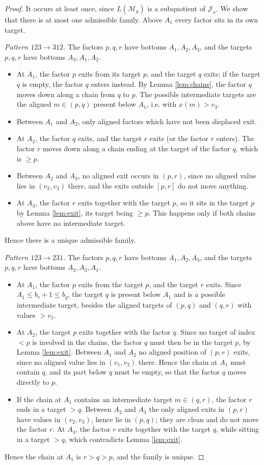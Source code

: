 \documentclass[a4paper,12pt,leqno]{amsart}
\newcommand{\caJ}{\mathcal{J}}
\newcommand{\caM}{\mathcal{M}}
\theoremstyle{plain}
\theoremstyle{definition}
\theoremstyle{definition}
\begin{document}
\begin{proof}
It occurs at least once, since $L(\caM_y)$ is a subquotient of $\caJ_x$. We show that there is at
most one admissible family. Above $A_1$ every factor sits in its own target.

\emph{Pattern $123\rightarrow312$.} The factors $p,q,r$ have bottoms $A_1,A_2,A_3$, and the targets
$p,q,r$ have bottoms $A_3,A_1,A_2$.
\begin{itemize}
\item At $A_1$, the factor $p$ exits from its target $p$, and the target $q$ exits; if the target $q$
is empty, the factor $q$ enters instead. By Lemma \ref{lem:chains}, the factor $q$ moves down along
a chain from $q$ to $p$. The possible intermediate targets are the aligned $m\in(p,q)$ present below
$A_1$, i.e. with $x(m)>v_3$.
\item Between $A_1$ and $A_2$, only aligned factors which have not been displaced exit.
\item At $A_2$, the factor $q$ exits, and the target $r$ exits (or the factor $r$ enters). The
factor $r$ moves down along a chain ending at the target of the factor $q$, which is $\geq p$.
\item Between $A_2$ and $A_3$, no aligned exit occurs in $(p,r)$, since no aligned value lies in
$(v_2,v_3)$ there, and the exits outside $[p,r]$ do not move anything.
\item At $A_3$, the factor $r$ exits together with the target $p$, so it sits in the target $p$
by Lemma \ref{lem:exit}, its target being $\geq p$. This happens only if both chains above have no
intermediate target.
\end{itemize}
Hence there is a unique admissible family.

\emph{Pattern $123\rightarrow231$.} The factors $p,q,r$ have bottoms $A_1,A_2,A_3$, and the targets
$p,q,r$ have bottoms $A_2,A_3,A_1$.
\begin{itemize}
\item At $A_1$, the factor $p$ exits from the target $p$, and the target $r$ exits. Since $A_1\leq
b_r+1\leq b_q$, the target $q$ is present below $A_1$ and is a possible intermediate target, besides
the aligned targets of $(p,q)$ and $(q,r)$ with values $>v_1$.
\item At $A_2$, the target $p$ exits together with the factor $q$. Since no target of index $<p$ is
involved in the chains, the factor $q$ must then be in the target $p$, by Lemma \ref{lem:exit}. Between $A_1$ and $A_2$ no
aligned position of $(p,r)$ exits, since no aligned value lies in $(v_1,v_2)$ there. Hence the
chain at $A_1$ must contain $q$, and its part below $q$ must be empty, so that the factor $q$ moves
directly to $p$.
\item If the chain at $A_1$ contains an intermediate target $m\in(q,r)$, the factor $r$ ends in a
target $>q$. Between $A_2$ and $A_3$ the only aligned exits in $(p,r)$ have values in $(v_2,v_3)$,
hence lie in $(p,q)$; they are clean and do not move the factor $r$. At $A_3$, the factor $r$ exits
together with the target $q$, while sitting in a target $>q$, which contradicts Lemma \ref{lem:exit}.
\end{itemize}
Hence the chain at $A_1$ is $r>q>p$, and the family is unique.


\end{proof}
\end{document}
